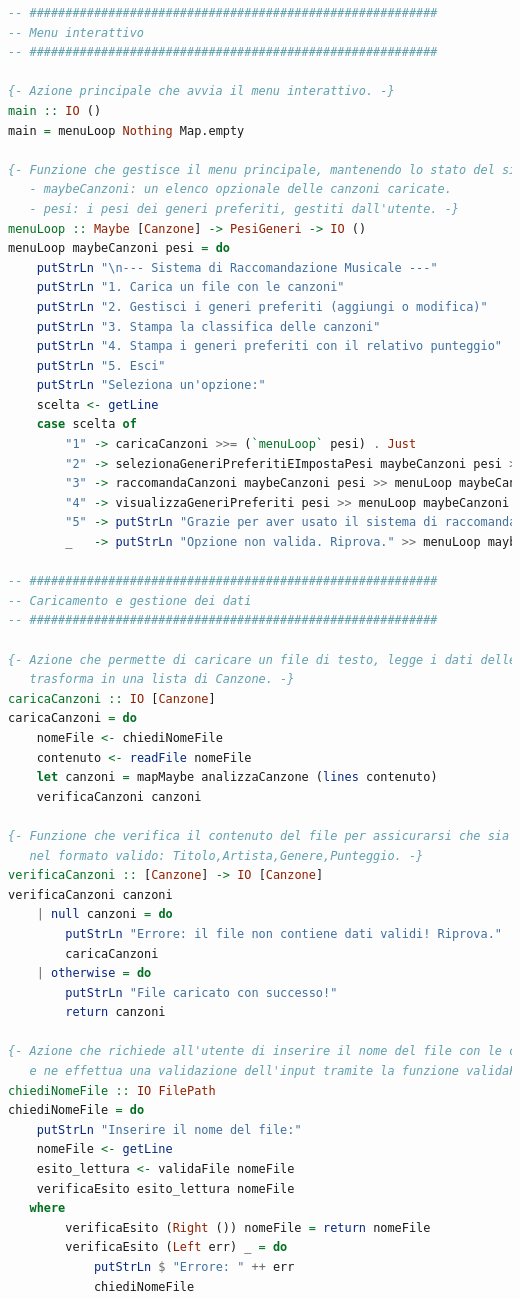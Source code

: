 \documentclass[a4paper,11pt]{article}
\begin{document}
\begin{lstlisting}[language=Haskell]
-- #########################################################
-- Menu interattivo
-- #########################################################

{- Azione principale che avvia il menu interattivo. -}
main :: IO ()
main = menuLoop Nothing Map.empty

{- Funzione che gestisce il menu principale, mantenendo lo stato del sistema:
   - maybeCanzoni: un elenco opzionale delle canzoni caricate.
   - pesi: i pesi dei generi preferiti, gestiti dall'utente. -}
menuLoop :: Maybe [Canzone] -> PesiGeneri -> IO ()
menuLoop maybeCanzoni pesi = do
    putStrLn "\n--- Sistema di Raccomandazione Musicale ---"
    putStrLn "1. Carica un file con le canzoni"
    putStrLn "2. Gestisci i generi preferiti (aggiungi o modifica)"
    putStrLn "3. Stampa la classifica delle canzoni"
    putStrLn "4. Stampa i generi preferiti con il relativo punteggio"
    putStrLn "5. Esci"
    putStrLn "Seleziona un'opzione:"
    scelta <- getLine
    case scelta of
        "1" -> caricaCanzoni >>= (`menuLoop` pesi) . Just
        "2" -> selezionaGeneriPreferitiEImpostaPesi maybeCanzoni pesi >>= menuLoop maybeCanzoni
        "3" -> raccomandaCanzoni maybeCanzoni pesi >> menuLoop maybeCanzoni pesi
        "4" -> visualizzaGeneriPreferiti pesi >> menuLoop maybeCanzoni pesi
        "5" -> putStrLn "Grazie per aver usato il sistema di raccomandazione. Arrivederci!"
        _   -> putStrLn "Opzione non valida. Riprova." >> menuLoop maybeCanzoni pesi

-- #########################################################
-- Caricamento e gestione dei dati
-- #########################################################

{- Azione che permette di caricare un file di testo, legge i dati delle canzoni e li
   trasforma in una lista di Canzone. -}
caricaCanzoni :: IO [Canzone]
caricaCanzoni = do
    nomeFile <- chiediNomeFile
    contenuto <- readFile nomeFile
    let canzoni = mapMaybe analizzaCanzone (lines contenuto)
    verificaCanzoni canzoni

{- Funzione che verifica il contenuto del file per assicurarsi che sia
   nel formato valido: Titolo,Artista,Genere,Punteggio. -}
verificaCanzoni :: [Canzone] -> IO [Canzone]
verificaCanzoni canzoni
    | null canzoni = do
        putStrLn "Errore: il file non contiene dati validi! Riprova."
        caricaCanzoni
    | otherwise = do
        putStrLn "File caricato con successo!"
        return canzoni

{- Azione che richiede all'utente di inserire il nome del file con le canzoni
   e ne effettua una validazione dell'input tramite la funzione validaFile. -}
chiediNomeFile :: IO FilePath
chiediNomeFile = do
    putStrLn "Inserire il nome del file:"
    nomeFile <- getLine
    esito_lettura <- validaFile nomeFile
    verificaEsito esito_lettura nomeFile
   where
        verificaEsito (Right ()) nomeFile = return nomeFile
        verificaEsito (Left err) _ = do
            putStrLn $ "Errore: " ++ err
            chiediNomeFile


\end{lstlisting}
\end{document}
